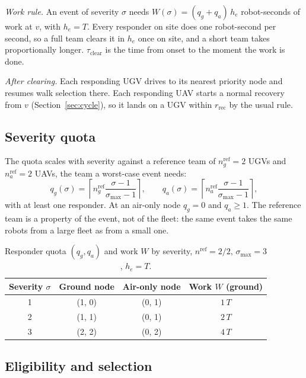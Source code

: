 \documentclass[11pt]{article}
\theoremstyle{definition}
\theoremstyle{plain}
\begin{document}
\emph{Work rule.} An event of severity $\sigma$ needs
$W(\sigma) = (q_g + q_a)\, h_e$ robot-seconds of work at $v$, with
$h_e = T$. Every responder on site does one robot-second per second, so
a full team clears it in $h_e$ once on site, and a short team takes
proportionally longer. $\tau_{\mathrm{clear}}$ is the time from onset to
the moment the work is done.

\emph{After clearing.} Each responding UGV drives to its nearest priority
node and resumes walk selection there. Each responding UAV starts a normal
recovery from $v$ (Section~\ref{sec:cycle}), so it lands on a UGV within
$r_{\mathrm{rec}}$ by the usual rule.

\subsection{Severity quota}
The quota scales with severity against a reference team of
$n_g^{\mathrm{ref}} = 2$ UGVs and $n_a^{\mathrm{ref}} = 2$ UAVs, the team
a worst-case event needs:
\begin{equation}
q_g(\sigma) = \left\lceil n_g^{\mathrm{ref}} \frac{\sigma - 1}{\sigma_{\max} - 1} \right\rceil,
\qquad
q_a(\sigma) = \left\lceil n_a^{\mathrm{ref}} \frac{\sigma - 1}{\sigma_{\max} - 1} \right\rceil,
\end{equation}
with at least one responder. At an air-only node $q_g = 0$ and
$q_a \geq 1$. The reference team is a property of the event, not of the
fleet: the same event takes the same robots from a large fleet as from a
small one.

\begin{table}[H]
\centering
\small
\caption{Responder quota $(q_g, q_a)$ and work $W$ by severity,
$n^{\mathrm{ref}} = 2/2$, $\sigma_{\max} = 3$, $h_e = T$.}
\label{tab:quota}
\begin{tabular}{cccc}
\toprule
Severity $\sigma$ & Ground node & Air-only node & Work $W$ (ground) \\
\midrule
1 & (1, 0) & (0, 1) & $1\,T$ \\
2 & (1, 1) & (0, 1) & $2\,T$ \\
3 & (2, 2) & (0, 2) & $4\,T$ \\
\bottomrule
\end{tabular}
\end{table}

\subsection{Eligibility and selection}
\end{document}
